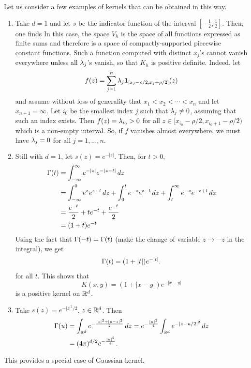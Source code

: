 Let us consider a few examples of kernels that can be obtained in this way.
\begin{enumerate}[label=(\arabic*), wide=0pt]
\item
Take $d=1$ and let $s$ be the indicator  function of the interval $[-\frac12, \frac12]$.  
Then, one finds
In this case, the space $V_h$ is the space of all functions expressed as finite sums
and therefore is a space of compactly-supported piecewise constant functions. 
Such a function computed with distinct $x_j$'s cannot vanish everywhere unless all $\lambda_j$'s vanish, so that $K_h$ is positive definite. 
Indeed, let
\[
f(z) = \sum_{j=1}^n \lambda_j {\bm 1}_{[x_j - \rho/2, x_j+\rho/2]}(z)
\]
and assume without loss of generality that $x_1 < x_2 < \cdots < x_n$ and let $x_{n+1} = \infty$. Let $i_0$ be the smallest index $j$ such that $\lambda_j \neq 0$, assuming that such an index exists. Then $f(z) = \lambda_{i_0}>0$ for all $z\in [x_{i_0}-\rho/2, x_{i_0+1} - \rho/2)$ which is a non-empty interval.  So, if $f$ vanishes almost everywhere, we must have $\lambda_j=0$ for all $j=1, \ldots, n$.
\item Still with $d=1$, let $s(z) = e^{-|z|}$. Then, for $t>0$, 
\begin{align*}
\Gamma(t) &= \int_{-\infty}^\infty e^{-|z|} e^{-|z-t|}\, dz\\
&= \int_{-\infty}^0 e^{z} e^{z-t}\, dz + \int_0^t e^{-z} e^{z-t}\, dz + \int_{t}^\infty e^{-z} e^{-z+t}\, dz\\
&= \frac{e^{-t}}2 + t e^{-t} + \frac{e^{-t}}{2}\\
&= (1 + t) e^{-t}
\end{align*}
Using the fact that $\Gamma(-t) = \Gamma(t)$ (make the change of variable $z\to -z$ in the integral), we get 
\[
\Gamma(t) = (1 + |t|) e^{-|t|}.
\]
for all $t$. This shows that 
\[
K(x,y) = (1+|x-y|) e^{-|x-y|}
\] 
is a positive kernel on ${\mathbb{R}}^d$.
\item Take $s(z) = e^{-|z|^2/2}$,  $z\in {\mathbb{R}}^d$. Then 
\begin{align*}
\Gamma(u) &= \int_{{\mathbb{R}}^d} e^{-\frac{|z|^2 + |u-z|^2}2}\, dz
= e^{-\frac{|u|^2}4} \int_{{\mathbb{R}}^d} e^{- |z-u/2|^2}\, dz\\
&= (4\pi)^{d/2} e^{-\frac{|u|^2}4}.
\end{align*} 
\end{enumerate}
This provides a special case of Gaussian kernel.

